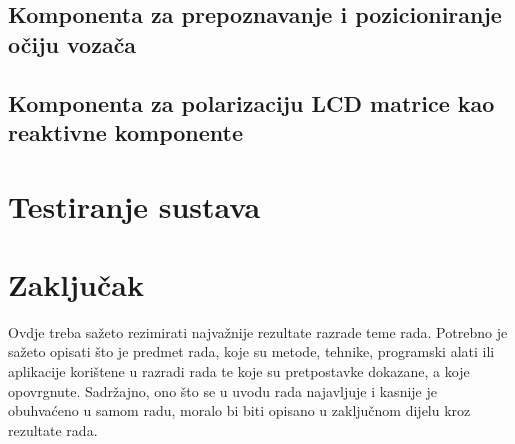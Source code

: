 \documentclass{foi}
\begin{document}
\section{Komponenta za prepoznavanje i pozicioniranje očiju vozača}

\section{Komponenta za polarizaciju LCD matrice kao reaktivne komponente}

\chapter{Testiranje sustava}

\chapter{Zaključak}

Ovdje treba sažeto rezimirati najvažnije rezultate razrade teme rada. Potrebno je sažeto opisati što je predmet rada, koje su metode, tehnike, programski alati ili aplikacije korištene u razradi rada te koje su pretpostavke dokazane, a koje opovrgnute. Sadržajno, ono što se u uvodu rada najavljuje i kasnije je obuhvaćeno u samom radu, moralo bi biti opisano u zaključnom dijelu kroz rezultate rada.

\printbibliography[title=Popis literature]

\listoffigures
{}
 
\listoftables
{}
\end{document}
